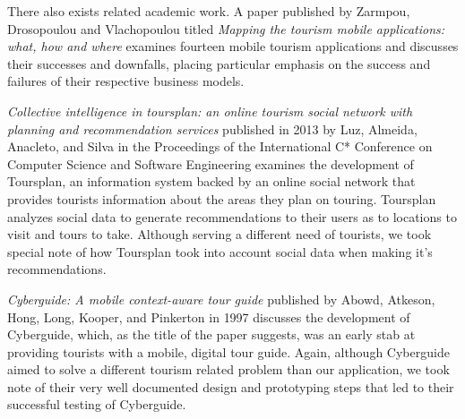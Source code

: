 \documentclass{sigchi}
\begin{document}
There also exists related academic work. A paper published by Zarmpou, Drosopoulou and Vlachopoulou titled \emph{Mapping the tourism mobile applications: what, how and where} examines fourteen mobile tourism applications and discusses their successes and downfalls, placing particular emphasis on the success and failures of their respective business models. 

\emph{Collective intelligence in toursplan: an online tourism social network with planning and recommendation services} published in 2013 by Luz, Almeida, Anacleto, and Silva in the Proceedings of the International C* Conference on Computer Science and Software Engineering examines the development of Toursplan, an information system backed by an online social network that provides tourists information about the areas they plan on touring. Toursplan analyzes social data to generate recommendations to their users as to locations to visit and tours to take. Although serving a different need of tourists, we took special note of how Toursplan took into account social data when making it's recommendations. 

\emph{Cyberguide: A mobile context-aware tour guide} published by Abowd, Atkeson, Hong, Long, Kooper, and Pinkerton in 1997 discusses the development of Cyberguide, which, as the title of the paper suggests, was an early stab at providing tourists with a mobile, digital tour guide. Again, although Cyberguide aimed to solve a different tourism related problem than our application, we took note of their very well documented design and prototyping steps that led to their successful testing of Cyberguide.
\end{document}

